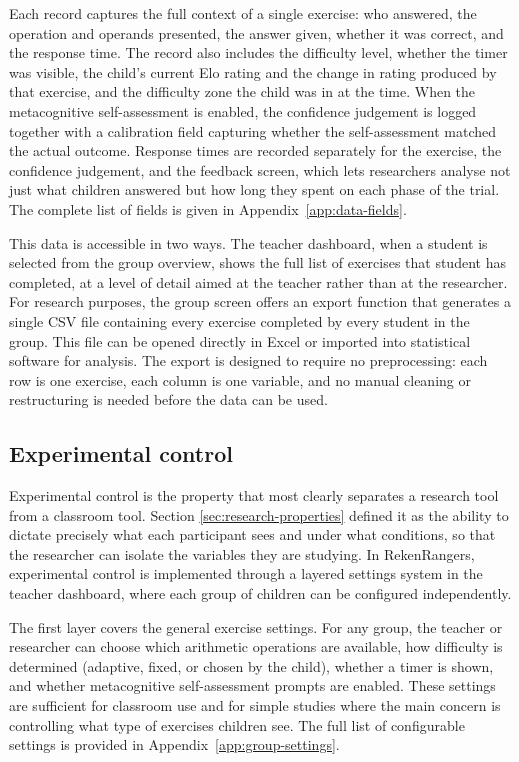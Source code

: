 Each record captures the full context of a single exercise: who answered, the operation and operands presented, the answer given, whether it was correct, and the response time. The record also includes the difficulty level, whether the timer was visible, the child's current Elo rating and the change in rating produced by that exercise, and the difficulty zone the child was in at the time. When the metacognitive self-assessment is enabled, the confidence judgement is logged together with a calibration field capturing whether the self-assessment matched the actual outcome. Response times are recorded separately for the exercise, the confidence judgement, and the feedback screen, which lets researchers analyse not just what children answered but how long they spent on each phase of the trial. The complete list of fields is given in Appendix~\ref{app:data-fields}.

This data is accessible in two ways. The teacher dashboard, when a student is selected from the group overview, shows the full list of exercises that student has completed, at a level of detail aimed at the teacher rather than at the researcher. For research purposes, the group screen offers an export function that generates a single CSV file containing every exercise completed by every student in the group. This file can be opened directly in Excel or imported into statistical software for analysis. The export is designed to require no preprocessing: each row is one exercise, each column is one variable, and no manual cleaning or restructuring is needed before the data can be used.

\subsection{Experimental control}
\label{sec:experimental-control}
Experimental control is the property that most clearly separates a research tool from a classroom tool. Section \ref{sec:research-properties} defined it as the ability to dictate precisely what each participant sees and under what conditions, so that the researcher can isolate the variables they are studying. In RekenRangers, experimental control is implemented through a layered settings system in the teacher dashboard, where each group of children can be configured independently.

The first layer covers the general exercise settings. For any group, the teacher or researcher can choose which arithmetic operations are available, how difficulty is determined (adaptive, fixed, or chosen by the child), whether a timer is shown, and whether metacognitive self-assessment prompts are enabled. These settings are sufficient for classroom use and for simple studies where the main concern is controlling what type of exercises children see. The full list of configurable settings is provided in Appendix~\ref{app:group-settings}.


